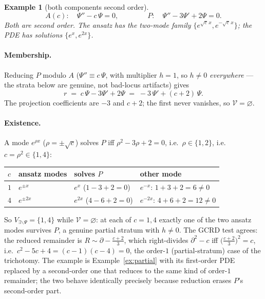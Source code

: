 \documentclass[11pt]{article}
\newcommand{\Psib}{\Psi}
\newcommand{\Var}{\mathcal{V}}
\newtheorem{example}{Example}
\begin{document}
\begin{example}[both components second order]
\label{ex:both2}
%
\begin{equation}
\label{eq:both2}
A(c): \quad \Psib'' - c\,\Psib = 0,
\qquad\qquad
P: \quad \Psib'' - 3\Psib' + 2\Psib = 0 .
\end{equation}
%
Both are second order. The ansatz has the two-mode family
$\{e^{\sqrt{c}\,x}, e^{-\sqrt{c}\,x}\}$; the PDE has solutions $\{e^{x},
e^{2x}\}$.
\end{example}

\paragraph{Membership.}
Reducing $P$ modulo $A$ ($\Psib'' \equiv c\,\Psib$, with multiplier $h = 1$,
so $h \neq 0$ \emph{everywhere} --- the strata below are genuine, not
bad-locus artifacts) gives
\[
r \;=\; c\,\Psib - 3\Psib' + 2\Psib \;=\; -3\,\Psib' + (c+2)\,\Psib .
\]
The projection coefficients are $-3$ and $c+2$; the first never vanishes, so
$\Var = \varnothing$.

\paragraph{Existence.}
A mode $e^{\rho x}$ ($\rho = \pm\sqrt{c}$) solves $P$ iff
$\rho^2 - 3\rho + 2 = 0$, i.e.\ $\rho \in \{1, 2\}$, i.e.\ $c = \rho^2 \in
\{1, 4\}$:
%
\begin{center}
\begin{tabular}{llll}
\toprule
$c$ & ansatz modes & solves $P$ & other mode \\
\midrule
$1$ & $e^{\pm x}$  & $e^{x}$  ($1-3+2=0$) & $e^{-x}$: $1+3+2 = 6 \neq 0$ \\
$4$ & $e^{\pm 2x}$ & $e^{2x}$ ($4-6+2=0$) & $e^{-2x}$: $4+6+2 = 12 \neq 0$ \\
\bottomrule
\end{tabular}
\end{center}
%
\noindent
So $V_{\exists\backslash\Psib} = \{1, 4\}$ while $\Var = \varnothing$: at each
of $c = 1, 4$ exactly one of the two ansatz modes survives $P$, a genuine
partial stratum with $h \neq 0$. The GCRD test agrees: the reduced remainder
is $R \sim \partial - \tfrac{c+2}{3}$, which right-divides $\partial^2 - c$ iff
$\big(\tfrac{c+2}{3}\big)^2 = c$, i.e.\ $c^2 - 5c + 4 = (c-1)(c-4) = 0$, the
order-$1$ (partial-stratum) case of the trichotomy. The example is
Example~\ref{ex:partial} with its first-order PDE replaced by a second-order
one that reduces to the same kind of order-$1$ remainder; the two behave
identically precisely because reduction erases $P$'s second-order part.
\end{document}
